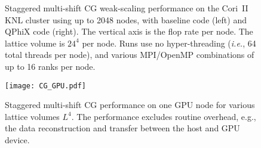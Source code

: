 \documentclass[epj]{webofc}
\begin{document}
\begin{figure}[tp]
   \centering
    \hspace{1.1cm} %

   \caption{Staggered multi-shift CG weak-scaling performance on the Cori~II 
KNL cluster using up to 2048 nodes, with baseline code (left) and QPhiX code (right). 
The vertical axis is the flop rate per node. The lattice volume is $24^4$ per node. 
   Runs use no hyper-threading (\emph{i.e.}, 64 total threads per node), and various MPI/OpenMP combinations of up to 16 ranks per node. 
   }
   \label{Fig.3}
\end{figure}

\begin{figure}[thb]
  \centering
  \sidecaption
  \texttt{[image: CG\_GPU.pdf]}
  \caption{Staggered multi-shift CG performance on one GPU node for various lattice volumes $L^4$. 
  The performance excludes routine overhead, e.g., the data reconstruction and transfer between the host and GPU device. }%
  \label{Fig.9}%
\end{figure}
\end{document}
